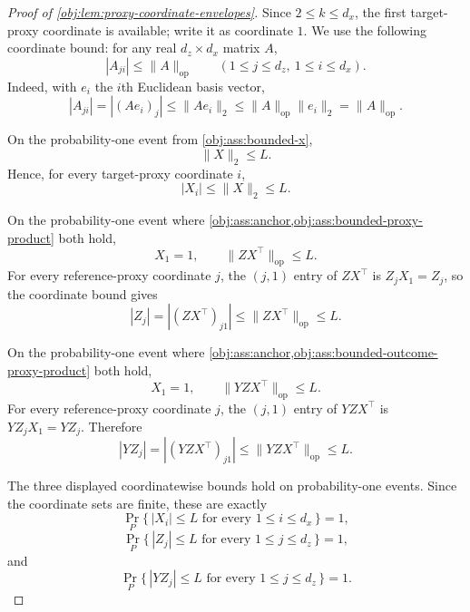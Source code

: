 \documentclass[11pt]{article}
\begin{document}
\begin{proof}[Proof of \cref{obj:lem:proxy-coordinate-envelopes}]
Since \(2\le k\le d_x\), the first target-proxy coordinate is available; write it as coordinate \(1\). We use the following coordinate bound: for any real \(d_z\times d_x\) matrix \(A\),
\[
|A_{j i}|\le \|A\|_{\mathrm{op}}
\qquad
(1\le j\le d_z,\ 1\le i\le d_x).
\]
Indeed, with \(e_i\) the \(i\)th Euclidean basis vector,
\[
|A_{j i}|
=
|(Ae_i)_j|
\le
\|Ae_i\|_2
\le
\|A\|_{\mathrm{op}}\|e_i\|_2
=
\|A\|_{\mathrm{op}} .
\] %

On the probability-one event from \cref{obj:ass:bounded-x},
\[
\|X\|_2\le L .
\]
Hence, for every target-proxy coordinate \(i\),
\[
|X_i|\le \|X\|_2\le L .
\] %

On the probability-one event where \cref{obj:ass:anchor,obj:ass:bounded-proxy-product} both hold,
\[
X_1=1,
\qquad
\|ZX^\top\|_{\mathrm{op}}\le L .
\]
For every reference-proxy coordinate \(j\), the \((j,1)\) entry of \(ZX^\top\) is \(Z_jX_1=Z_j\), so the coordinate bound gives
\[
|Z_j|
=
|(ZX^\top)_{j1}|
\le
\|ZX^\top\|_{\mathrm{op}}
\le L .
\] %

On the probability-one event where \cref{obj:ass:anchor,obj:ass:bounded-outcome-proxy-product} both hold,
\[
X_1=1,
\qquad
\|YZX^\top\|_{\mathrm{op}}\le L .
\]
For every reference-proxy coordinate \(j\), the \((j,1)\) entry of \(YZX^\top\) is \(YZ_jX_1=YZ_j\). Therefore
\[
|YZ_j|
=
|(YZX^\top)_{j1}|
\le
\|YZX^\top\|_{\mathrm{op}}
\le L .
\] %

The three displayed coordinatewise bounds hold on probability-one events. Since the coordinate sets are finite, these are exactly
\[
\Pr_P\{\,|X_i|\le L\text{ for every }1\le i\le d_x\,\}=1,
\]
\[
\Pr_P\{\,|Z_j|\le L\text{ for every }1\le j\le d_z\,\}=1,
\]
and
\[
\Pr_P\{\,|YZ_j|\le L\text{ for every }1\le j\le d_z\,\}=1 .
\] %
\end{proof}
\end{document}
